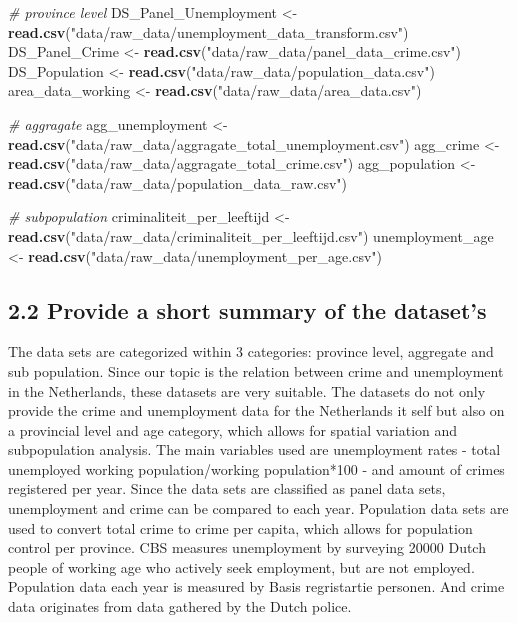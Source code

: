 \documentclass[
]{article}
\newenvironment{Shaded}{\begin{snugshade}}{\end{snugshade}}
\newcommand{\CommentTok}[1]{\textcolor[rgb]{0.56,0.35,0.01}{\textit{#1}}}
\newcommand{\FunctionTok}[1]{\textcolor[rgb]{0.13,0.29,0.53}{\textbf{#1}}}
\newcommand{\NormalTok}[1]{#1}
\newcommand{\OtherTok}[1]{\textcolor[rgb]{0.56,0.35,0.01}{#1}}
\newcommand{\StringTok}[1]{\textcolor[rgb]{0.31,0.60,0.02}{#1}}
\begin{document}
\begin{Shaded}
\begin{Highlighting}[]
\CommentTok{\# province level}
\NormalTok{DS\_Panel\_Unemployment }\OtherTok{\textless{}{-}} \FunctionTok{read.csv}\NormalTok{(}\StringTok{"data/raw\_data/unemployment\_data\_transform.csv"}\NormalTok{)}
\NormalTok{DS\_Panel\_Crime }\OtherTok{\textless{}{-}} \FunctionTok{read.csv}\NormalTok{(}\StringTok{"data/raw\_data/panel\_data\_crime.csv"}\NormalTok{)}
\NormalTok{DS\_Population }\OtherTok{\textless{}{-}} \FunctionTok{read.csv}\NormalTok{(}\StringTok{"data/raw\_data/population\_data.csv"}\NormalTok{)}
\NormalTok{area\_data\_working }\OtherTok{\textless{}{-}} \FunctionTok{read.csv}\NormalTok{(}\StringTok{"data/raw\_data/area\_data.csv"}\NormalTok{)}

\CommentTok{\# aggragate}
\NormalTok{agg\_unemployment }\OtherTok{\textless{}{-}} \FunctionTok{read.csv}\NormalTok{(}\StringTok{"data/raw\_data/aggragate\_total\_unemployment.csv"}\NormalTok{)}
\NormalTok{agg\_crime }\OtherTok{\textless{}{-}} \FunctionTok{read.csv}\NormalTok{(}\StringTok{"data/raw\_data/aggragate\_total\_crime.csv"}\NormalTok{)}
\NormalTok{agg\_population }\OtherTok{\textless{}{-}} \FunctionTok{read.csv}\NormalTok{(}\StringTok{"data/raw\_data/population\_data\_raw.csv"}\NormalTok{)}

\CommentTok{\# subpopulation}
\NormalTok{criminaliteit\_per\_leeftijd }\OtherTok{\textless{}{-}} \FunctionTok{read.csv}\NormalTok{(}\StringTok{"data/raw\_data/criminaliteit\_per\_leeftijd.csv"}\NormalTok{) }
\NormalTok{unemployment\_age }\OtherTok{\textless{}{-}} \FunctionTok{read.csv}\NormalTok{(}\StringTok{"data/raw\_data/unemployment\_per\_age.csv"}\NormalTok{) }
\end{Highlighting}
\end{Shaded}

\subsection{2.2 Provide a short summary of the
dataset's}\label{provide-a-short-summary-of-the-datasets}

The data sets are categorized within 3 categories: province level,
aggregate and sub population. Since our topic is the relation between
crime and unemployment in the Netherlands, these datasets are very
suitable. The datasets do not only provide the crime and unemployment
data for the Netherlands it self but also on a provincial level and age
category, which allows for spatial variation and subpopulation analysis.
The main variables used are unemployment rates - total unemployed
working population/working population*100 - and amount of crimes
registered per year. Since the data sets are classified as panel data
sets, unemployment and crime can be compared to each year. Population
data sets are used to convert total crime to crime per capita, which
allows for population control per province. CBS measures unemployment by
surveying 20000 Dutch people of working age who actively seek
employment, but are not employed. Population data each year is measured
by Basis regristartie personen. And crime data originates from data
gathered by the Dutch police.
\end{document}
